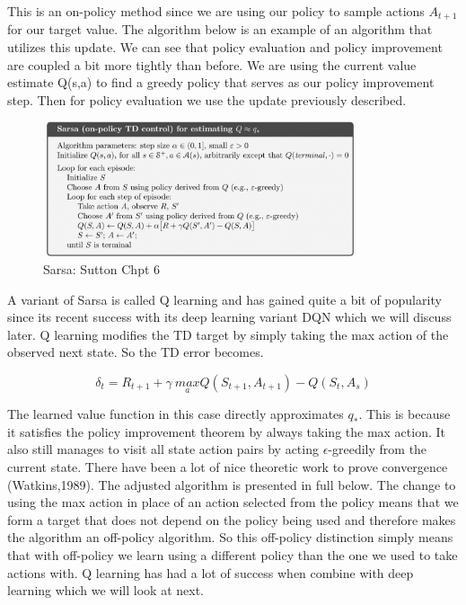 This is an on-policy method since we are using our policy to sample actions $A_{t + 1}$ for our target value. The algorithm below is an example of an algorithm that utilizes this update. We can see that policy evaluation and policy improvement are coupled a bit more tightly than before. We are using the current value estimate Q(s,a) to find a greedy policy that serves as our policy improvement step. Then for policy evaluation we use the update previously described. 

\begin{figure}[H]
        \centering
        \includegraphics[width=350px,height=150px]{images/sarsa.png}
        \caption{Sarsa: Sutton Chpt 6}
        \label{fig:my_label}
    \end{figure}

A variant of Sarsa is called Q learning and has gained quite a bit of popularity since its recent success with its deep learning variant DQN which we will discuss later. Q learning modifies the TD target by simply taking the max action of the observed next state. So the TD error becomes. 

\begin{equation}
   \delta_{t} = R_{t + 1} + \gamma \: \underset{a}{max}Q(S_{t + 1},A_{t + 1}) - Q(S_{t},A_{s})
\end{equation}

The learned value function in this case directly approximates $q_{*}$. This is because it satisfies the policy improvement theorem by always taking the max action. It also still manages to visit all state action pairs by acting $\epsilon$-greedily from the current state. There have been a lot of nice theoretic work to prove convergence (Watkins,1989). The adjusted algorithm is presented in full below. The change to using the max action in place of an action selected from the policy means that we form a target that does not depend on the policy being used and therefore makes the algorithm an off-policy algorithm. So this off-policy distinction simply means that with off-policy we learn using a different policy than the one we used to take actions with. Q learning has had a lot of success when combine with deep learning which we will look at next. 

